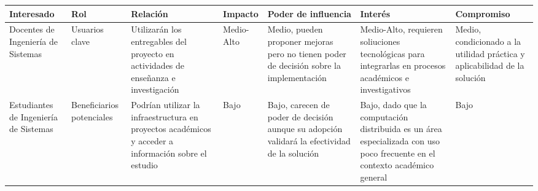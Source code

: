 \begin{table}[H]
	\centering
	\fontsize{7}{7}\selectfont %
	\setlength{\tabcolsep}{3pt} %
	\renewcommand{\arraystretch}{1.4} %
	\begin{tabularx}{\textwidth}{%
		>{\raggedright\arraybackslash}p{1.7cm}  %
		>{\raggedright\arraybackslash}p{1.5cm}    %
		>{\raggedright\arraybackslash}p{2.3cm}  %
		>{\raggedright\arraybackslash}p{1.4cm}  %
		>{\raggedright\arraybackslash}p{2.0cm}  %
		>{\raggedright\arraybackslash}p{2.5cm}    %
		>{\raggedright\arraybackslash}p{2.0cm}} %
		\toprule
		\textbf{Interesado}                              & \textbf{Rol}                               & \textbf{Relación}                                                                                                                                      & \textbf{Impacto} & \textbf{Poder de influencia}                                                                                            & \textbf{Interés}                                                                                                                          & \textbf{Compromiso}                                                                                \\
		\midrule
		Docentes de Ingeniería de Sistemas               & Usuarios clave                             & Utilizarán los entregables del proyecto en actividades de enseñanza e investigación                                                                    & Medio-Alto       & Medio, pueden proponer mejoras pero no tienen poder de decisión sobre la implementación                                 & Medio-Alto, requieren soliuciones tecnológicas para integrarlas en procesos académicos e investigativos                                   & Medio, condicionado a la utilidad práctica y aplicabilidad de la solución                          \\
		\midrule
		Estudiantes de Ingeniería de Sistemas            & Beneficiarios potenciales                  & Podrían utilizar la infraestructura en proyectos académicos y acceder a información sobre el estudio                                                   & Bajo             & Bajo, carecen de poder de decisión aunque su adopción validará la efectividad de la solución                            & Bajo, dado que la computación distribuida es un área especializada con uso poco frecuente en el contexto académico general                & Bajo                                                                                               \\

\end{tabularx}
\end{table}
